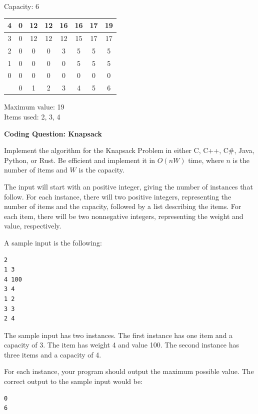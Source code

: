 \documentclass[solutionorbox,answers]{exam}
\begin{document}
\begin{questions}
\begin{center}
Capacity: 6
\end{center}
  \begin{solutionbox}{} \vspace{1em} 
    \begin{center}
    \begin{tabular}{ |c|c|c|c|c|c|c|c| } 
    \hline
    4 & 0 & 12 & 12 & 16 & 16 & 17 & 19 \\ 
    \hline
    3 & 0 & 12 & 12 & 12 & 15 & 17 & 17 \\ 
    \hline
    2 & 0 & 0 & 0 & 3 & 5 & 5 & 5 \\ 
    \hline
    1 & 0 & 0 & 0 & 0 & 5 & 5 & 5 \\  
    \hline
    0 & 0 & 0 & 0 & 0 & 0 & 0 & 0 \\ 
    \hline
     & 0 & 1 & 2 & 3 & 4 & 5 & 6 \\ 
    \hline
\end{tabular}
\end{center}

Maximum value: 19\\
Items used: 2, 3, 4\\
  \end{solutionbox}


\newpage

\question \textbf{Coding Question: Knapsack}

Implement the algorithm for the Knapsack Problem in either C, C++, C\#, Java, Python, or Rust. Be efficient and implement it in $O(nW)$ time, where $n$ is the number of items and $W$ is the capacity.

The input will start with an positive integer, giving the number of instances that follow. For each instance, there will two positive integers, representing the number of items and the capacity, followed by a list describing the items.
For each item, there will be two nonnegative integers, representing the weight and value, respectively.

A sample input is the following:

\begin{verbatim}
2
1 3
4 100
3 4
1 2
3 3
2 4
\end{verbatim}
The sample input has two instances. The first instance has one item and a capacity of 3. The item has weight 4 and value 100. 
The second instance has three items and a capacity of 4.

For each instance, your program should output the maximum possible value.
The correct output to the sample input would be:

\begin{verbatim}
0 
6
\end{verbatim}


\end{questions}
\end{document}
